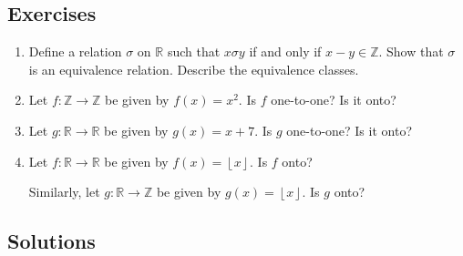 \documentclass[a4paper,12pt]{article}
\newcommand{\R}{\mathbb{R}}
\newcommand{\Z}{\mathbb{Z}}
\newcommand{\floor}[1]{\left \lfloor #1 \right \rfloor}
\begin{document}
\pagestyle{myheadings}

\subsection*{Exercises}

\begin{enumerate}
\item
Define a relation $\sigma$ on $\R$ such that $x \sigma y$ if and only if
$x - y \in \Z$. Show that $\sigma$ is an equivalence relation.
Describe the equivalence classes.

\item
Let $f : \Z \to \Z$ be given by $f(x) = x^2$. Is $f$ one-to-one? Is it onto?

\item
Let $g : \R \to \R$ be given by $g(x) = x + 7$. Is $g$ one-to-one? Is it onto?

\item
Let $f : \R \to \R$ be given by $f(x) = \floor{x}$. Is $f$ onto?

Similarly, let $g : \R \to \Z$ be given by $g(x) = \floor{x}$. Is $g$ onto?
\end{enumerate}

\newpage

\subsection*{Solutions}
\end{document}
